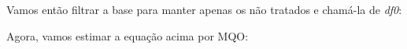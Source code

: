 \documentclass[portugues]{article}
\newenvironment{Shaded}{\begin{snugshade}}{\end{snugshade}}
\newcommand{\DecValTok}[1]{\textcolor[rgb]{0.00,0.00,0.81}{#1}}
\newcommand{\FunctionTok}[1]{\textcolor[rgb]{0.13,0.29,0.53}{\textbf{#1}}}
\newcommand{\NormalTok}[1]{#1}
\newcommand{\OtherTok}[1]{\textcolor[rgb]{0.56,0.35,0.01}{#1}}
\newcommand{\SpecialCharTok}[1]{\textcolor[rgb]{0.81,0.36,0.00}{\textbf{#1}}}
\begin{document}
Vamos então filtrar a base para manter apenas os não tratados e chamá-la de \textit{df0}:

\begin{box_code}

\begin{Shaded}
\end{Shaded}

\end{box_code}

Agora, vamos estimar a equação acima por MQO:
\end{document}
